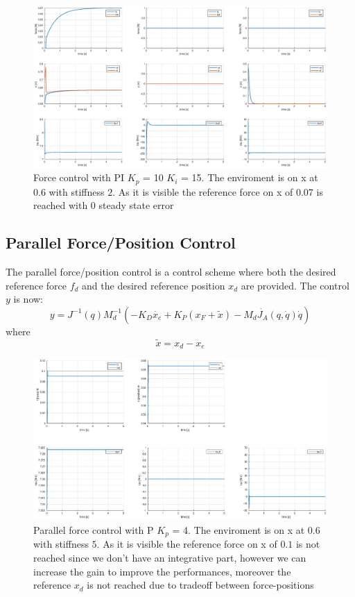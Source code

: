 \documentclass[a4paper,12pt]{article}
\begin{document}
\begin{figure}[H]
    \begin{center}
        \hspace*{-4.5cm}
        \includegraphics[scale=0.5]{images/force_control_pi.eps}
    \end{center}
    \caption{Force control with PI $K_p$ = 10 $K_i$ = 15. The enviroment is on x at 0.6 with stiffness $2$. As it is visible the reference force on x of $0.07$ is reached with 0 steady state error}
    \label{fig:force_pi}
\end{figure}

\newpage
\subsection{Parallel Force/Position Control}
The parallel force/position control is a control scheme where both the desired reference force $f_d$ and the desired reference position $x_d$ are provided. The control $y$ is now:
\[
    y = J^{-1}(q)M_d^{-1}\left(-K_D\dot{x_e} + K_P(x_F+\tilde{x}) - M_d\dot{J_A}(q,\dot{q})\dot{q}\right)
\]
where 
\[
    \tilde{x} = x_d - x_e
\]
\begin{figure}[H]
    \begin{center}
        \hspace*{-4.5cm}
        \includegraphics[scale=0.5]{images/parallel_p.eps}
    \end{center}
    \caption{Parallel force control with P $K_p$ = 4. The enviroment is on x at 0.6 with stiffness $5$. As it is visible the reference force on x of $0.1$ is not reached since we don't have an integrative part, however we can increase the gain to improve the performances, moreover the reference $x_d$ is not reached due to tradeoff between force-positions}
    \label{fig:parallel_p}
\end{figure}
\end{document}

